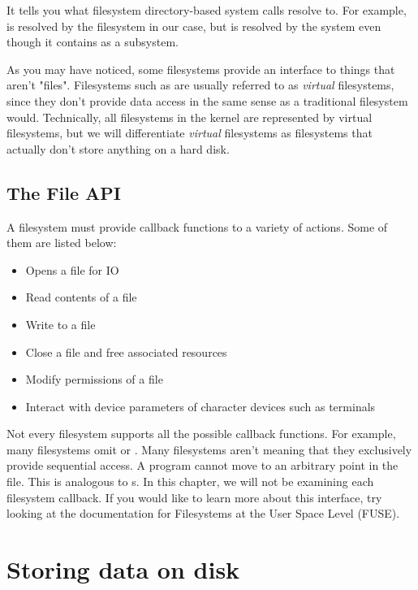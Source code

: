 It tells you what filesystem directory-based system calls resolve to.
For example, \keyword{/} is resolved by the  filesystem in our case, but  is resolved by the  system even though it contains \keyword{/} as a subsystem.

As you may have noticed, some filesystems provide an interface to things that aren't "files".
Filesystems such as  are usually referred to as \emph{virtual} filesystems, since they don't provide data access in the same sense as a traditional filesystem would.
Technically, all filesystems in the kernel are represented by virtual filesystems, but we will differentiate \emph{virtual} filesystems as filesystems that actually don't store anything on a hard disk.

\subsection{The File API}

A filesystem must provide callback functions to a variety of actions.
Some of them are listed below:

\begin{itemize}
  \item {} Opens a file for IO
  \item {} Read contents of a file
  \item {} Write to a file
  \item {} Close a file and free associated resources
  \item {} Modify permissions of a file
  \item {} Interact with device parameters of character devices such as terminals
\end{itemize}

Not every filesystem supports all the possible callback functions.
For example, many filesystems omit  or .
Many filesystems aren't  meaning that they exclusively provide sequential access.
A program cannot move to an arbitrary point in the file.
This is analogous to s.
In this chapter, we will not be examining each filesystem callback.
If you would like to learn more about this interface, try looking at the documentation for Filesystems at the User Space Level (FUSE).

\section{Storing data on disk}

